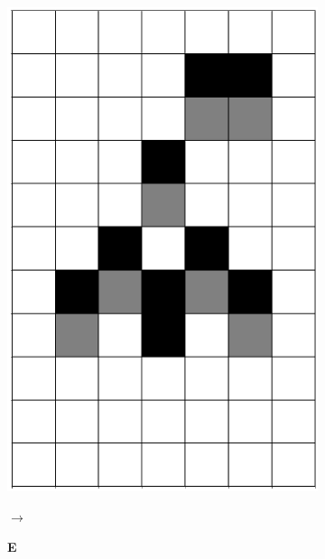 \documentclass[12pt]{article}
\numberwithin{figure}{section} %
\begin{document}
\begin{figure}[H]
\begin{subfigure}{0.3\textwidth}
     		\includegraphics[angle=270,width=\linewidth]{Section4/6.2}
     		\subcaption{}
   	\end{subfigure}
	\begin{subfigure}[t]{0.03\textwidth}
      		{\LARGE$\xrightarrow{}$}
	\end{subfigure}
      	\newline
   	\setcounter{subfigure}{0}
     	\begin{subfigure}[t]{0.03\textwidth}
    		\textbf{E}
  	\end{subfigure}		
        \begin{subfigure}{0.3\textwidth}
     		\centering

\end{subfigure}
\end{figure}
\end{document}
